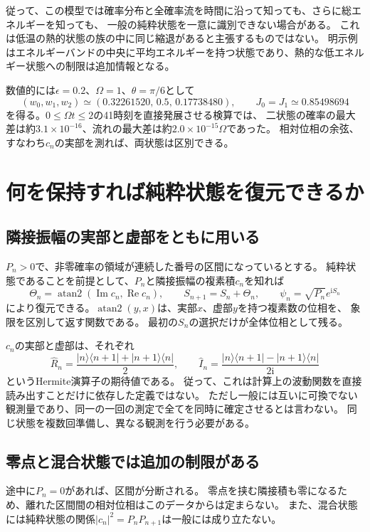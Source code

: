 \documentclass[a4paper,11pt]{ltjsarticle}
\numberwithin{equation}{section}
\newcommand{\ket}[1]{\lvert #1\rangle}
\newcommand{\bra}[1]{\langle #1\rvert}
\newcommand{\ii}{\mathrm i}
\begin{document}
従って、この模型では確率分布と全確率流を時間に沿って知っても、さらに総エネルギーを知っても、
一般の純粋状態を一意に識別できない場合がある。
これは低温の熱的状態の族の中に同じ縮退があると主張するものではない。
明示例はエネルギーバンドの中央に平均エネルギーを持つ状態であり、熱的な低エネルギー状態への制限は追加情報となる。

数値的には$\epsilon=0.2$、$\Omega=1$、$\theta=\pi/6$として
\begin{equation}
 (w_0,w_1,w_2)\simeq(0.32261520,\,0.5,\,0.17738480),
 \qquad J_0=J_1\simeq0.85498694
 \label{eq:ambignumeric}
\end{equation}
を得る。$0\leq\Omega t\leq2$の41時刻を直接発展させる検算では、
二状態の確率の最大差は約$3.1\times10^{-16}$、流れの最大差は約$2.0\times10^{-15}\Omega$であった。
相対位相の余弦、すなわち$c_n$の実部を測れば、両状態は区別できる。

\section{何を保持すれば純粋状態を復元できるか}
\subsection{隣接振幅の実部と虚部をともに用いる}
$P_n>0$で、非零確率の領域が連続した番号の区間になっているとする。
純粋状態であることを前提として、$P_n$と隣接振幅の複素積$c_n$を知れば
\begin{equation}
 \Theta_n=\operatorname{atan2}(\operatorname{Im}c_n,\operatorname{Re}c_n),
 \qquad S_{n+1}=S_n+\Theta_n,
 \qquad \psi_n=\sqrt{P_n}e^{\ii S_n}
 \label{eq:reconstruction}
\end{equation}
により復元できる。$\operatorname{atan2}(y,x)$は、実部$x$、虚部$y$を持つ複素数の位相を、
象限を区別して返す関数である。
最初の$S_n$の選択だけが全体位相として残る。

$c_n$の実部と虚部は、それぞれ
\begin{equation}
 \hat R_n=\frac{\ket n\bra{n+1}+\ket{n+1}\bra n}{2},\qquad
 \hat I_n=\frac{\ket n\bra{n+1}-\ket{n+1}\bra n}{2\ii}
 \label{eq:observables}
\end{equation}
というHermite演算子の期待値である。
従って、これは計算上の波動関数を直接読み出すことだけに依存した定義ではない。
ただし一般には互いに可換でない観測量であり、同一の一回の測定で全てを同時に確定させるとは言わない。
同じ状態を複数回準備し、異なる観測を行う必要がある。

\subsection{零点と混合状態では追加の制限がある}
途中に$P_n=0$があれば、区間が分断される。
零点を挟む隣接積も零になるため、離れた区間間の相対位相はこのデータからは定まらない。
また、混合状態には純粋状態の関係$|c_n|^2=P_nP_{n+1}$は一般には成り立たない。
\end{document}
